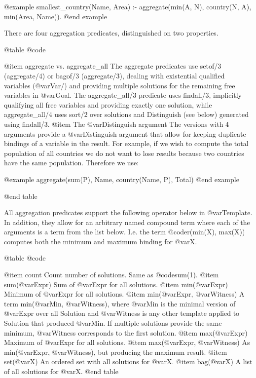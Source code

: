 {{{{{{{{{@example
smallest_country(Name, Area) :-
        aggregate(min(A, N), country(N, A), min(Area, Name)).
@end example

There are four aggregation predicates, distinguished on two properties.

@table @code

@item aggregate vs. aggregate_all
    The aggregate predicates use setof/3 (aggregate/4) or bagof/3
    (aggregate/3), dealing with existential qualified variables
    (@var{Var}/) and providing multiple solutions for the
    remaining free variables in @var{Goal}. The aggregate_all/3
    predicate uses findall/3, implicitly qualifying all free variables
    and providing exactly one solution, while aggregate_all/4 uses
    sort/2 over solutions and Distinguish (see below) generated using
    findall/3. 
@item The @var{Distinguish} argument
    The versions with 4 arguments provide a @var{Distinguish} argument
    that allow for keeping duplicate bindings of a variable in the
    result. For example, if we wish to compute the total population of
    all countries we do not want to lose results because two countries
    have the same population. Therefore we use:

@example
        aggregate(sum(P), Name, country(Name, P), Total)
@end example

@end table

All aggregation predicates support the following operator below in
@var{Template}. In addition, they allow for an arbitrary named compound
term where each of the arguments is a term from the list below. I.e. the
term @code{r(min(X), max(X))} computes both the minimum and maximum
binding for @var{X}.

@table @code

@item count
    Count number of solutions. Same as @code{sum(1)}. 
@item sum(@var{Expr})
    Sum of @var{Expr} for all solutions. 
@item min(@var{Expr})
    Minimum of @var{Expr} for all solutions. 
@item min(@var{Expr}, @var{Witness})
    A term min(@var{Min}, @var{Witness}), where @var{Min} is the minimal version of @var{Expr}
    over all Solution and @var{Witness} is any other template applied to
    Solution that produced @var{Min}. If multiple solutions provide the same
    minimum, @var{Witness} corresponds to the first solution. 
@item max(@var{Expr})
    Maximum of @var{Expr} for all solutions. 
@item max(@var{Expr}, @var{Witness})
    As min(@var{Expr}, @var{Witness}), but producing the maximum result. 
@item set(@var{X})
    An ordered set with all solutions for @var{X}. 
@item bag(@var{X})
    A list of all solutions for @var{X}. 
@end table

}}}}}}}}}
